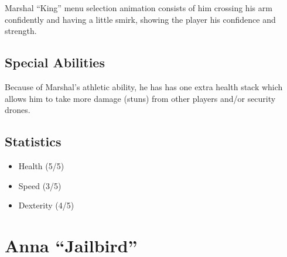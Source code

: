 \documentclass[10pt]{report}
\begin{document}
\begin{multicols}{2}
    Marshal “King” menu selection animation consists of him crossing his arm confidently and having a little smirk, showing the player his confidence and strength.
    
    \subsection{Special Abilities}
    
    Because of Marshal’s athletic ability, he has has one extra health stack which allows him to take more damage (stuns) from other players and/or security drones.
    
    \subsection{Statistics}
    
    \begin{itemize}
        \item Health (5/5)
        \item Speed (3/5)
        \item Dexterity (4/5)
    \end{itemize}
\end{multicols}
    
\pagebreak

\section{Anna ``Jailbird''}
\end{document}
